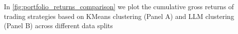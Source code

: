 
%

In \cref{fig:portfolio_returns_comparison} we plot the cumulative gross returns of trading strategies based on KMeans clustering (Panel A) and LLM clustering (Panel B) across different data splits

